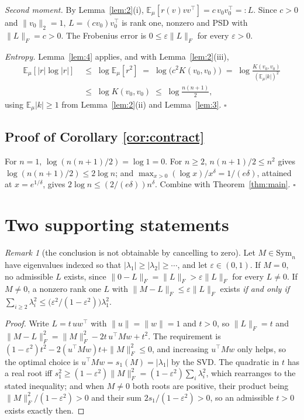 \documentclass[11pt]{article}
\theoremstyle{remark}
\newtheorem{remark}[theorem]{Remark}
\newcommand{\Ex}{\mathbb{E}}
\newcommand{\Sym}{\mathrm{Sym}_n}
\begin{document}
\emph{Second moment.} By Lemma~\ref{lem:2}(i),
$\Ex_\mu[r(v)vv^{\top}]=c\,v_0v_0^{\top}=:L$. Since $c>0$ and $\|v_0\|_2=1$,
$L=(cv_0)v_0^{\top}$ is rank one, nonzero and PSD with $\|L\|_F=c>0$. The Frobenius error is
$0\leq\varepsilon\|L\|_F$ for every $\varepsilon>0$.

\emph{Entropy.} Lemma~\ref{lem:4} applies, and with Lemma~\ref{lem:2}(iii),
\[
\begin{aligned}
  \Ex_\mu[|r|\log|r|] \;&\leq\; \log\Ex_\mu[r^2] \;=\; \log\big(c^2K(v_0,v_0)\big)
  \;=\; \log\frac{K(v_0,v_0)}{(\Ex_\mu|k|)^2} \\
  &\leq\; \log K(v_0,v_0) \;\leq\; \log\frac{n(n+1)}{2},
\end{aligned}
\]
using $\Ex_\mu|k|\geq 1$ from Lemma~\ref{lem:2}(ii) and Lemma~\ref{lem:3}. \hfill$\square$

\subsection*{Proof of Corollary \ref{cor:contract}}

For $n=1$, $\log(n(n+1)/2)=\log 1 = 0$. For $n\geq 2$, $n(n+1)/2\leq n^2$ gives
$\log(n(n+1)/2)\leq 2\log n$; and $\max_{x>0}(\log x)/x^{\delta}=1/(e\delta)$, attained at
$x=e^{1/\delta}$, gives $2\log n\leq (2/(e\delta))n^{\delta}$. Combine with
Theorem~\ref{thm:main}. \hfill$\square$

\section{Two supporting statements}

\begin{remark}[the conclusion is not obtainable by cancelling to zero]\label{rem:A}
Let $M\in\Sym$ have eigenvalues indexed so that $|\lambda_1|\geq|\lambda_2|\geq\cdots$, and let
$\varepsilon\in(0,1)$. If $M=0$, no admissible $L$ exists, since
$\|0-L\|_F=\|L\|_F>\varepsilon\|L\|_F$ for every $L\neq 0$. If $M\neq 0$, a nonzero rank one
$L$ with $\|M-L\|_F\leq\varepsilon\|L\|_F$ exists \emph{if and only if}
$\sum_{i\geq 2}\lambda_i^2 \leq \big(\varepsilon^2/(1-\varepsilon^2)\big)\lambda_1^2$.
\end{remark}

\begin{proof}
Write $L=t\,uw^{\top}$ with $\|u\|=\|w\|=1$ and $t>0$, so $\|L\|_F=t$ and
$\|M-L\|_F^2=\|M\|_F^2-2t\,u^{\top}Mw+t^2$. The requirement is
$(1-\varepsilon^2)t^2-2(u^{\top}Mw)t+\|M\|_F^2\leq 0$, and increasing $u^{\top}Mw$ only helps,
so the optimal choice is $u^{\top}Mw=s_1(M)=|\lambda_1|$ by the SVD. The quadratic in $t$ has a
real root iff $s_1^2\geq(1-\varepsilon^2)\|M\|_F^2=(1-\varepsilon^2)\sum_i\lambda_i^2$, which
rearranges to the stated inequality; and when $M\neq 0$ both roots are positive, their product
being $\|M\|_F^2/(1-\varepsilon^2)>0$ and their sum $2s_1/(1-\varepsilon^2)>0$, so an
admissible $t>0$ exists exactly then.
\end{proof}
\end{document}
